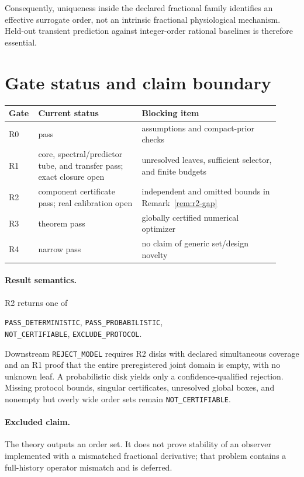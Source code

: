 \documentclass[11pt]{article}
\theoremstyle{definition}
\theoremstyle{remark}
\begin{document}
Consequently, uniqueness inside the declared fractional family identifies an
effective surrogate order, not an intrinsic fractional physiological
mechanism.  Held-out transient prediction against integer-order rational
baselines is therefore essential.

\section{Gate status and claim boundary}

\begin{center}
\begin{tabular}{@{}p{0.08\linewidth}p{0.36\linewidth}p{0.48\linewidth}@{}}
\toprule
Gate & Current status & Blocking item\\
\midrule
R0 & pass & assumptions and compact-prior checks\\
R1 & core, spectral/predictor tube, and transfer pass; exact closure open &
unresolved leaves, sufficient selector, and finite budgets\\
R2 & component certificate pass; real calibration open &
independent and omitted bounds in Remark~\ref{rem:r2-gap}\\
R3 & theorem pass & globally certified numerical optimizer\\
R4 & narrow pass & no claim of generic set/design novelty\\
\bottomrule
\end{tabular}
\end{center}

\paragraph{Result semantics.}\mbox{}\par
R2 returns one of
\begin{center}
\texttt{PASS\_DETERMINISTIC}, \texttt{PASS\_PROBABILISTIC},\\
\texttt{NOT\_CERTIFIABLE}, \texttt{EXCLUDE\_PROTOCOL}.
\end{center}
Downstream \texttt{REJECT\_MODEL} requires R2 disks with declared simultaneous
coverage and an R1 proof that the entire preregistered joint domain is empty,
with no unknown leaf.  A probabilistic disk yields only a
confidence-qualified rejection.  Missing protocol bounds, singular
certificates, unresolved global boxes, and nonempty but overly wide order sets
remain \texttt{NOT\_CERTIFIABLE}.

\paragraph{Excluded claim.}
The theory outputs an order set.  It does not prove stability of an observer
implemented with a mismatched fractional derivative; that problem contains a
full-history operator mismatch and is deferred.
\end{document}
